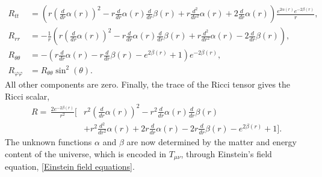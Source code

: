 \begin{align}
    R_{tt}
    & =
    \left(r \left(\frac{d}{d r} \alpha{\left(r \right)}\right)^{2} - r \frac{d}{d r} \alpha{\left(r \right)} \frac{d}{d r} \beta{\left(r \right)} + r \frac{d^{2}}{d r^{2}} \alpha{\left(r \right)} + 2 \frac{d}{d r} \alpha{\left(r \right)}
        \right)
    \frac{
         e^{2 \alpha{\left(r \right)}} e^{- 2 \beta{\left(r \right)}}}{r}, \\
    R_{rr}
    & =
    - \frac{1}{r}
    \left(
        r \left(\frac{d}{d r} \alpha{\left(r \right)}\right)^{2} - r \frac{d}{d r} \alpha{\left(r \right)} \frac{d}{d r} \beta{\left(r \right)} + r \frac{d^{2}}{d r^{2}} \alpha{\left(r \right)} - 2 \frac{d}{d r} \beta{\left(r \right)} 
    \right),\\
    R_{\theta \theta}
    &=
    - \left(r \frac{d}{d r} \alpha{\left(r \right)} - r \frac{d}{d r} \beta{\left(r \right)} - e^{2 \beta{\left(r \right)}} + 1\right) e^{- 2 \beta{\left(r \right)}}, \\
    R_{\varphi \varphi} & = R_{\theta \theta} \sin^2( \theta).
\end{align}
%
All other components are zero.
Finally, the trace of the Ricci tensor gives the Ricci scalar,
%
\begin{align}
    \nonumber
    R =
    \, \frac{2 e^{- 2 \beta{\left(r \right)}}}{r^{2}}
    \bigg[
        &
        r^{2} \left(\frac{d}{d r} \alpha{\left(r \right)}\right)^{2} 
        - r^{2} \frac{d}{d r} \alpha{\left(r \right)} \frac{d}{d r} \beta{\left(r \right)}
        \\ &
        + r^{2} \frac{d^{2}}{d r^{2}} \alpha{\left(r \right)} 
        + 2 r \frac{d}{d r} \alpha{\left(r \right)} 
        - 2 r \frac{d}{d r} \beta{\left(r \right)} - e^{2 \beta{\left(r \right)}} + 1
    \bigg].
\end{align}
%
 The unknown functions $\alpha$ and $\beta$ are now determined by the matter and energy content of the universe, which is encoded in $T_{\mu \nu}$, through Einstein's field equation, \autoref{Einstein field equations}.
 

